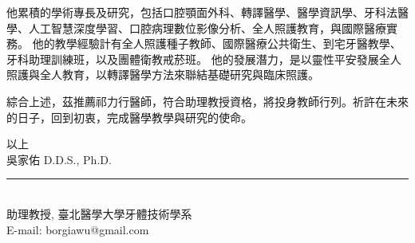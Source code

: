 \documentclass{letter}
\begin{document}
\begin{letter}
他累積的學術專長及研究，包括口腔顎面外科、轉譯醫學、醫學資訊學、牙科法醫學、人工智慧深度學習、口腔病理數位影像分析、全人照護教育，與國際醫療實務。
他的教學經驗計有全人照護種子教師、國際醫療公共衛生、到宅牙醫教學、牙科助理訓練班，以及團體衛教戒菸班。
他的發展潛力，是以靈性平安發展全人照護與全人教育，以轉譯醫學方法來聯結基礎研究與臨床照護。


綜合上述，茲推薦祁力行醫師，符合助理教授資格，將投身教師行列。祈許在未來的日子，回到初衷，完成醫學教學與研究的使命。

\medskip
以上 \\ 
吳家佑 D.D.S., Ph.D.\hspace{3mm} \rule[-1mm]{3cm}{0.15mm} \\%
助理教授, 臺北醫學大學牙體技術學系\\
E-mail: borgiawu@gmail.com\\[0.5cm]



\end{letter}
\end{document}
